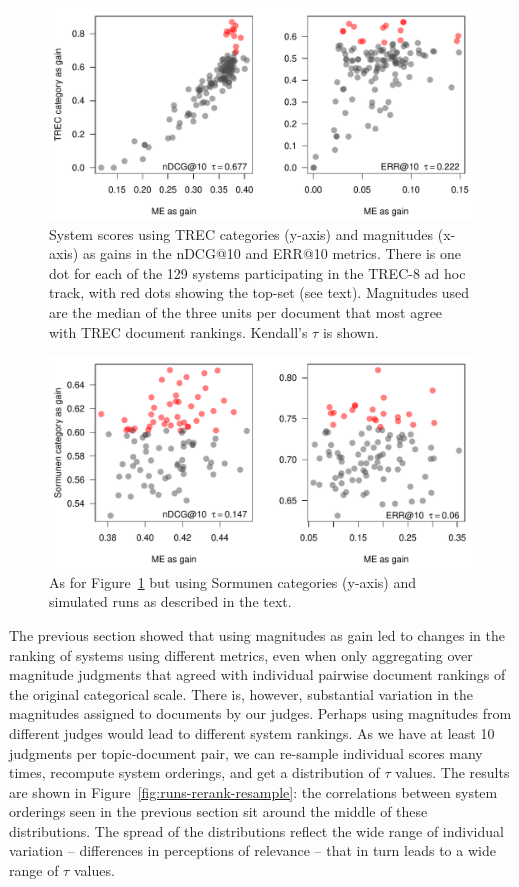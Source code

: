 \begin{figure}[tbp]
  \centering
  \includegraphics[width=.6\linewidth]{figs/sysRank_scatter_TREC_med3bestME.pdf}
  \caption{System scores using TREC categories (y-axis) 
    and magnitudes (x-axis) as gains in 
    the nDCG@10 and ERR@10 metrics. There is one dot for each of the 129 systems 
    participating in the TREC-8 ad hoc track, with red dots showing the top-set (see text).
    Magnitudes used are the median of the three units per document that most agree with TREC
    document rankings.
    Kendall's $\tau$ is shown. 
  \label{fig:runs-rerank-median3best}
  }
\end{figure}
\begin{figure}[tbp]
  \centering
  \includegraphics[width=.6\linewidth]{figs/sysRank_scatter_FAKE_medME3bestME.pdf}
  \caption{As for Figure~\ref{fig:runs-rerank-median3best} but using 
           Sormunen categories (y-axis) and simulated runs as described in the text.
  \label{fig:runs-rerank-median3best-fake}
  }
\end{figure}


The previous section showed that using magnitudes as gain led to
changes in the ranking of systems using different metrics, even when
only aggregating over magnitude judgments that agreed with individual pairwise
document rankings of the original categorical scale.
There is, however, substantial variation in the magnitudes assigned to documents
by our judges.
Perhaps using magnitudes from different judges would lead to different 
system rankings. 
As we have at least 10 judgments per topic-document pair, we can
re-sample individual scores many times, recompute system orderings, and
get a distribution of $\tau$ values.
The results are shown in Figure~\ref{fig:runs-rerank-resample}: the
correlations between system orderings seen in the previous section sit around the middle 
of these distributions.
The spread of the distributions reflect the wide range of individual variation -- differences in
perceptions of relevance -- that in turn leads to a wide range of
$\tau$ values.


